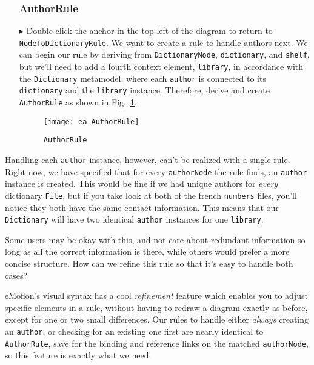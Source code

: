 \begin{itemize}
\subsubsection{AuthorRule} %

\item[$\blacktriangleright$] Double-click the anchor in the top left of the diagram to return to \texttt{NodeToDictionaryRule}. We want to create a rule to
handle authors next. We can begin our rule by deriving from \texttt{DictionaryNode}, \texttt{dictionary}, and \texttt{shelf}, but we'll need to add a fourth
context element, \texttt{library}, in accordance with the \texttt{Dictionary} metamodel, where each \texttt{author} is connected to its \texttt{dictionary} and
the \texttt{library} instance. Therefore, derive and create \texttt{AuthorRule} as shown in Fig.~\ref{ea:AuthorRule}.

\begin{figure}[h]
  \hspace{-2cm}
  \texttt{[image: ea\_AuthorRule]}
  \caption{\texttt{AuthorRule}}
  \label{ea:AuthorRule}
\end{figure}

\end{itemize}

Handling each \texttt{author} instance, however, can't be realized with a single rule. Right now, we have specified that for every \texttt{authorNode} the
rule finds, an \texttt{author} instance is created. This would be fine if we had unique authors for \emph{every} dictionary \texttt{File}, but if you take look
at both of the french \texttt{numbers} files, you'll notice they both have the same contact information. This means that our \texttt{Dictionary} will have two
identical \texttt{author} instances for one \texttt{library}.

Some users may be okay with this, and not care about redundant information so long as all the correct information is there, while others would prefer a
more concise structure. How can we refine this rule so that it's easy to handle both cases?

eMoflon's visual syntax has a cool \emph{refinement} feature which enables you to adjust specific elements in a rule, without having to redraw a
diagram exactly as before, except for one or two small differences. Our rules to handle either \emph{always} creating an \texttt{author}, or checking for an
existing one first are nearly identical to \texttt{AuthorRule}, save for the binding and reference links on the matched \texttt{authorNode}, so this feature is
exactly what we need.

